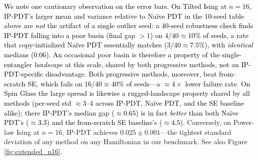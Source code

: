 \documentclass[11pt]{article}
\theoremstyle{plain}
\theoremstyle{plain}
\begin{document}
\textcolor{black}{We note one cautionary observation on the error bars.
On Tilted Ising at $n=16$, IP-PDT's larger mean and variance relative to
Na\"ive PDT in the $10$-seed table above are \emph{not} the artifact of a
single outlier seed: a $40$-seed robustness check finds IP-PDT falling into
a poor basin (final gap $>1$) on $4/40 \approx 10\%$ of seeds, a rate that
copy-initialized Na\"ive PDT essentially matches ($3/40 \approx 7.5\%$),
with \emph{identical} medians ($0.06$).  An occasional poor basin is
therefore a property of the single-entangler \emph{landscape} at this
scale, shared by both progressive methods, not an IP-PDT-specific
disadvantage.   Both progressive methods,
moreover, beat from-scratch SE, which fails on $16/40 \approx 40\%$ of
seeds---a $\approx 4\times$ lower failure rate.  On Spin Glass the large
spread is likewise a rugged-landscape property shared by all methods
(per-seed std $\approx 3$--$4$ across IP-PDT, Na\"ive PDT, and the SE
baseline alike); there IP-PDT's median gap ($\approx 0.65$) is in fact
\emph{better} than both Na\"ive PDT's ($\approx 3.3$) and the from-scratch
SE baseline's ($\approx 4.5$).}
Conversely, on Power-law Ising at $n=16$, IP-PDT
achieves $0.025\pm 0.001$---the tightest standard deviation of any
method on any Hamiltonian in our benchmark.
See also Figure \ref{fig:extended_n16}.
\end{document}
